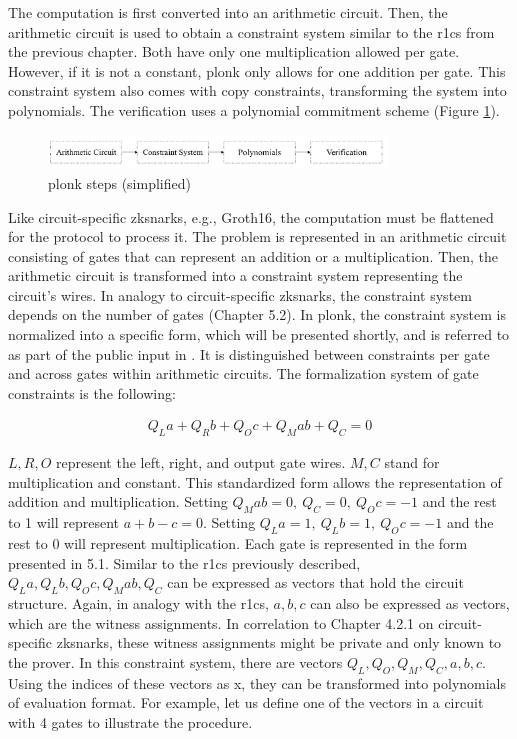 The computation is first converted into an arithmetic circuit. Then, the arithmetic circuit is used to obtain a constraint system similar to the \acrshort{r1cs} from the previous chapter. Both have only one multiplication allowed per gate. However, if it is not a constant, \acrshort{plonk} only allows for one addition per gate. This constraint system also comes with copy constraints, transforming the system into polynomials. The verification uses a polynomial commitment scheme (Figure \ref{fig:plonk}).

\begin{figure}[hbt]
	\centering
		\includegraphics[width=0.8\textwidth]{Pictures/plonk_process.png}
	\caption{\acrshort{plonk} steps (simplified)}
	\label{fig:plonk}
\end{figure}

Like circuit-specific \acrshort{zksnark}s, e.g., Groth16, the computation must be flattened for the protocol to process it. The problem is represented in an arithmetic circuit consisting of gates that can represent an addition or a multiplication. Then, the arithmetic circuit is transformed into a constraint system representing the circuit's wires. In analogy to circuit-specific \acrshort{zksnark}s, the constraint system depends on the number of gates (Chapter 5.2). In \acrshort{plonk}, the constraint system is normalized into a specific form, which will be presented shortly, and is referred to as part of the public input in \citet{PLONKcryptoeprint:2019/953}. 
It is distinguished between constraints per gate and across gates within arithmetic circuits. The formalization system of gate constraints is the following:

\begin{align}
    Q_{L}a + Q_{R}b + Q_{O}c + Q_{M}ab + Q_C = 0
\end{align}

\(L, R, O\) represent the left, right, and output gate wires. \(M, C\) stand for multiplication and constant. This standardized form allows the representation of addition and multiplication. Setting \(Q_{M}ab = 0, \ Q_C=0, \ Q_{O}c = -1 \) and the rest to 1 will represent \(a + b - c = 0\). Setting \(Q_{L}a =1,\ Q_{L}b =1,\ Q_{O}c = -1\) and the rest to 0 will represent multiplication. Each gate is represented in the form presented in 5.1. Similar to the \acrshort{r1cs} previously described, \(Q_{L}a, Q_{L}b, Q_{O}c, Q_{M}ab, Q_C\) can be expressed as vectors that hold the circuit structure. Again, in analogy with the \acrshort{r1cs}, \(a, b, c\) can also be expressed as vectors, which are the witness assignments. In correlation to Chapter 4.2.1 on circuit-specific \acrshort{zksnark}s, these witness assignments might be private and only known to the prover.
In this constraint system, there are vectors \(Q_{L}, Q_{O}, Q_{M}, Q_C, a, b, c\). Using the indices of these vectors as x, they can be transformed into polynomials of evaluation format. For example, let us define one of the vectors in a circuit with 4 gates to illustrate the procedure. 

